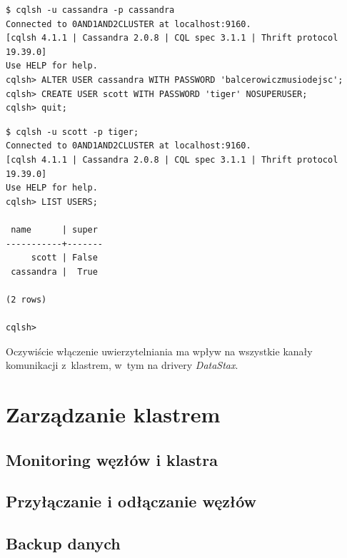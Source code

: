 \documentclass{article} %
\begin{document}
\begin{lstlisting}[style=bash, caption={konfiguracja kont użytkowników}]
$ cqlsh -u cassandra -p cassandra
Connected to 0AND1AND2CLUSTER at localhost:9160.
[cqlsh 4.1.1 | Cassandra 2.0.8 | CQL spec 3.1.1 | Thrift protocol 19.39.0]
Use HELP for help.
cqlsh> ALTER USER cassandra WITH PASSWORD 'balcerowiczmusiodejsc';
cqlsh> CREATE USER scott WITH PASSWORD 'tiger' NOSUPERUSER;
cqlsh> quit;
\end{lstlisting}

\pagebreak

\begin{lstlisting}[style=bash, caption={weryfikacja konfiguracji kont użytkowników}]
$ cqlsh -u scott -p tiger;
Connected to 0AND1AND2CLUSTER at localhost:9160.
[cqlsh 4.1.1 | Cassandra 2.0.8 | CQL spec 3.1.1 | Thrift protocol 19.39.0]
Use HELP for help.
cqlsh> LIST USERS;

 name      | super
-----------+-------
     scott | False
 cassandra |  True

(2 rows)

cqlsh>
\end{lstlisting}

Oczywiście włączenie uwierzytelniania ma wpływ na wszystkie kanały komunikacji z~klastrem, w~tym na drivery \emph{DataStax}.

\section{Zarządzanie klastrem}

\subsection{Monitoring węzłów i klastra}

\subsection{Przyłączanie i odłączanie węzłów}

\subsection{Backup danych}

\pagebreak
\end{document}
